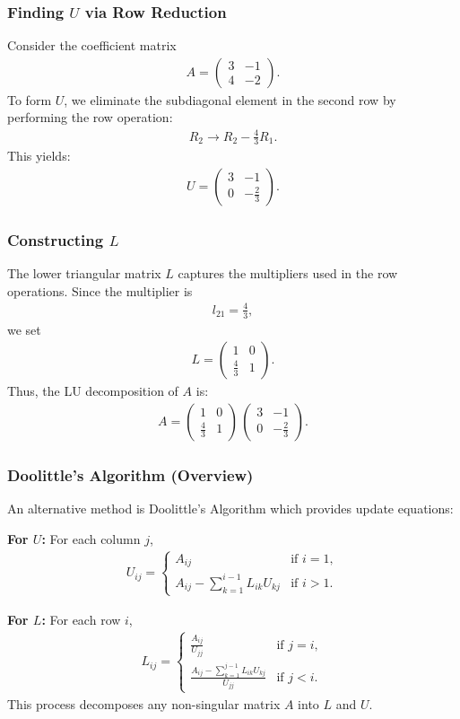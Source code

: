 \documentclass{beamer}
\newcommand{\myvec}[1]{\ensuremath{\begin{pmatrix}#1\end{pmatrix}}}
\numberwithin{equation}{section}
\begin{document}
\begin{frame}
\frametitle{Finding $U$ via Row Reduction}
Consider the coefficient matrix
\begin{align}
A = \myvec{3 & -1\\ 4 & -2}.
\end{align}
To form $U$, we eliminate the subdiagonal element in the second row by performing the row operation:
\begin{align}
R_2 \rightarrow R_2 - \frac{4}{3}R_1.
\end{align}
This yields:
\begin{align}
U = \myvec{3 & -1\\ 0 & -\frac{2}{3}}.
\end{align}
\end{frame}

\begin{frame}
\frametitle{Constructing $L$}
The lower triangular matrix $L$ captures the multipliers used in the row operations. Since the multiplier is
\begin{align}
l_{21} = \frac{4}{3},
\end{align}
we set
\begin{align}
L = \myvec{1 & 0\\ \frac{4}{3} & 1}.
\end{align}
Thus, the LU decomposition of $A$ is:
\begin{align}
A = \myvec{1 & 0\\ \frac{4}{3} & 1}\,\myvec{3 & -1\\ 0 & -\frac{2}{3}}.
\end{align}
\end{frame}

\begin{frame}
\frametitle{Doolittle's Algorithm (Overview)}
An alternative method is Doolittle's Algorithm which provides update equations:

\textbf{For $U$:} For each column $j$,
\begin{align}
U_{ij} = 
\begin{cases}
A_{ij} & \text{if } i=1,\\[0.5ex]
A_{ij} - \displaystyle\sum_{k=1}^{i-1} L_{ik}U_{kj} & \text{if } i>1.
\end{cases}
\end{align}

\textbf{For $L$:} For each row $i$,
\begin{align}
L_{ij} = 
\begin{cases}
\frac{A_{ij}}{U_{jj}} & \text{if } j=i,\\[0.5ex]
\frac{A_{ij} - \displaystyle\sum_{k=1}^{j-1} L_{ik}U_{kj}}{U_{jj}} & \text{if } j<i.
\end{cases}
\end{align}
This process decomposes any non-singular matrix $A$ into $L$ and $U$.
\end{frame}
\end{document}
